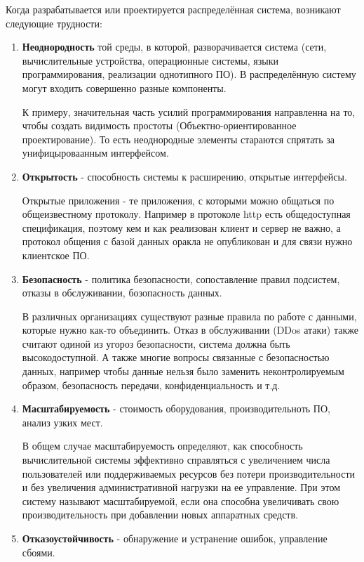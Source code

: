 Когда разрабатывается или проектируется распределённая система, возникают следующие трудности:
\begin{enumerate}
\item
\textbf{ Неоднородность} той среды, в которой, разворачивается система (сети, вычислительные устройства, операционные системы, языки программирования, реализации однотипного ПО). В распределённую систему могут входить совершенно разные компоненты.

К примеру, значительная часть усилий программирования направленна на то, чтобы создать видимость простоты (Объектно-ориентированное проектирование).
То есть неоднородные элементы стараются спрятать за унифицыроваанным интерфейсом.

\item
\textbf{ Открытость} - способность системы к расширению, открытые интерфейсы. 

Открытые приложения - те приложения, с которыми можно общаться по общеизвестному протоколу. Например в протоколе http есть общедоступная спецификация, поэтому кем и как реализован клиент и сервер не важно, а протокол общения с базой данных оракла не опубликован и для связи нужно клиентское ПО.

\item
\textbf{ Безопасность} - политика безопасности, сопоставление правил подсистем, отказы в обслуживании, бозопасность данных.

В различных организациях существуют разные правила по работе с данными, которые нужно как-то объединить. 
Отказ в обслуживании (DDos атаки) также считают одиной из угороз безопасности, система должна быть высокодоступной. 
А также многие вопросы связанные с безопасностью данных, например чтобы данные нельзя было заменить неконтролируемым образом, безопасность передачи, конфиденциальность и т.д.

\item
\textbf{ Масштабируемость} - стоимость оборудования, производительноть ПО, анализ узких мест.

В общем случае масштабируемость определяют, как способность вычислительной системы эффективно справляться с увеличением числа пользователей или поддерживаемых ресурсов без потери производительности и без увеличения административной нагрузки на ее управление. При этом систему называют масштабируемой, если она способна увеличивать свою производительность при добавлении новых аппаратных средств.  

\item
\textbf{ Отказоустойчивость} - обнаружение и устранение ошибок, управление сбоями.


\end{enumerate}
